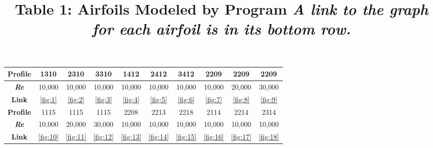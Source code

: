 \documentclass{article}
\begin{document}
\begin{table}[bp]
	\centering
	\title{Table 1: Airfoils Modeled by Program \newline}
	\title{\emph{A link to the graph for each airfoil is in its bottom row.}} \label{table:1}
	\begin{tabular}{ | c | c | c | c | c | c | c | c | c | c |}
		\hline
		 \textbf{Profile} & 1310 & 2310 & 3310 & 1412 & 2412 & 3412 & 2209 & 2209 & 2209 \\ \hline
		 \textbf{\emph{Re}} & 10,000 & 10,000 & 10,000 & 10,000 & 10,000 & 10,000 & 10,000 & 20,000 & 30,000 \\ 
		 \textbf{Link} & \ref{fig:1} & \ref{fig:2} & \ref{fig:3} & \ref{fig:4} & \ref{fig:5} & \ref{fig:6} & \ref{fig:7} & \ref{fig:8} & \ref{fig:9} \\ \hline \hline
		 \newline
		 \textbf{Profile} & 1115 & 1115 & 1115 & 2208 & 2213 & 2218 & 2114 & 2214 & 2314 \\ \hline
		 \textbf{\emph{Re}} & 10,000 & 20,000 & 30,000 & 10,000 & 10,000 & 10,000 & 10,000 & 10,000 & 10,000 \\ 
		 \textbf{Link} & \ref{fig:10} & \ref{fig:11} & \ref{fig:12} & \ref{fig:13} & \ref{fig:14} & \ref{fig:15} & \ref{fig:16} & \ref{fig:17} & \ref{fig:18} \\ \hline
	\end{tabular}
\end{table}
\end{document}
